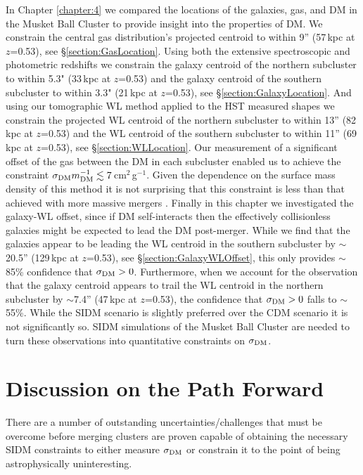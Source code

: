 In Chapter \ref{chapter:4} we compared the locations of the galaxies, gas, and DM in the Musket Ball Cluster to provide insight into the properties of DM.
We constrain the central gas distribution's projected centroid to within 9'' (57\,kpc at $z$=0.53), see \S\ref{section:GasLocation}.
Using both the extensive spectroscopic and photometric redshifts we constrain the galaxy centroid of the northern subcluster to within 5.3" (33\,kpc at $z$=0.53) and the galaxy centroid of the southern subcluster to within 3.3" (21\,kpc at $z$=0.53), see \S\ref{section:GalaxyLocation}.
And using our tomographic WL method applied to the HST measured shapes we constrain the projected WL centroid of the northern subcluster to within 13'' (82\,kpc at $z$=0.53) and the WL centroid of the southern subcluster to within 11'' (69\,kpc at $z$=0.53), see \S\ref{section:WLLocation}.
Our measurement of a significant offset of the gas between the DM in each subcluster enabled us to achieve the constraint $\sigma_{\rm DM} m_{\rm DM}^{-1} \lesssim 7$\,cm$^2$\,g$^{-1}$.
Given the dependence on the surface mass density of this method it is not surprising that this constraint is less than that achieved with more massive mergers \citep{Markevitch:2004dl, Bradac:2008gw, Merten:2011gu}.
Finally in this chapter we investigated the galaxy-WL offset, since if DM self-interacts then the effectively collisionless galaxies might be expected to lead the DM post-merger.
While we find that the galaxies appear to be leading the WL centroid in the southern subcluster by $\sim$20.5'' (129\,kpc at $z$=0.53), see \S\ref{section:GalaxyWLOffset}, this only provides $\sim$85\% confidence that $\sigma_{\rm DM}>0$.
Furthermore, when we account for the observation that the galaxy centroid appears to trail the WL centroid in the northern subcluster by $\sim$7.4'' (47\,kpc at $z$=0.53), the confidence that $\sigma_{\rm DM}>0$ falls to $\sim$55\%.
While the SIDM scenario is slightly preferred over the CDM scenario it is not significantly so.
SIDM simulations of the Musket Ball Cluster are needed to turn these observations into quantitative constraints on $\sigma_{\rm DM}$.


\section{Discussion on the Path Forward}

There are a number of outstanding uncertainties/challenges that must be overcome before merging clusters are proven capable of obtaining the necessary SIDM constraints to either measure $\sigma_{\rm DM}$ or constrain it to the point of being astrophysically uninteresting.

